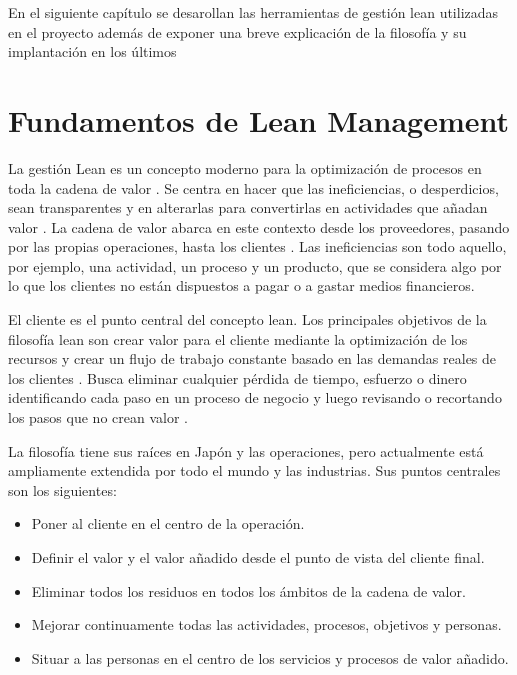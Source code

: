 En el siguiente capítulo se desarollan las herramientas de gestión lean utilizadas en el proyecto además de exponer una breve explicación de la filosofía y su implantación en los últimos

\section{Fundamentos de Lean Management}

La gestión Lean es un concepto moderno para la optimización de procesos en toda la cadena de valor \cite{helmold_progress_2019}.
Se centra en hacer que las ineficiencias, o desperdicios, sean transparentes y en alterarlas para convertirlas en actividades que añadan valor \cite{helmold_global_2016}.
La cadena de valor abarca en este contexto desde los proveedores, pasando por las propias operaciones, hasta los clientes \cite{slack_operations_2010}.
Las ineficiencias son todo aquello, por ejemplo, una actividad, un proceso y un producto, que se considera algo por lo que los clientes no están dispuestos a pagar o a gastar medios financieros.

El cliente es el punto central del concepto lean.
Los principales objetivos de la filosofía lean son crear valor para el cliente mediante la optimización de los recursos y crear un flujo de trabajo constante basado en las demandas reales de los clientes \cite{ohno_toyota_1988}. Busca eliminar cualquier pérdida de tiempo, esfuerzo o dinero identificando cada paso en un proceso de negocio y luego revisando o recortando los pasos que no crean valor \cite{bertagnolli_lean_2018}.

La filosofía tiene sus raíces en Japón y las operaciones, pero actualmente está ampliamente extendida por todo el mundo y las industrias. Sus puntos centrales son los siguientes:

\begin{itemize}
    \item Poner al cliente en el centro de la operación.
    \item Definir el valor y el valor añadido desde el punto de vista del cliente final.
    \item Eliminar todos los residuos en todos los ámbitos de la cadena de valor.
    \item Mejorar continuamente todas las actividades, procesos, objetivos y personas.
    \item Situar a las personas en el centro de los servicios y procesos de valor añadido.
\end{itemize}

